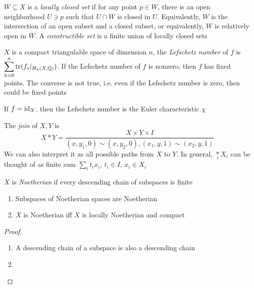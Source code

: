 \documentclass[main]{subfiles}
\begin{document}
\begin{definition}
$W\subseteq X$ is a \textit{locally closed set} if for any point $p\in W$, there is an open neighborhood $U\ni p$ such that $U\cap W$ is closed in $U$. Equivalently, $W$ is the intersection of an open subset and a closed subset, or equivalently, $W$ is relatively open in $\overline W$. A \textit{constructible set} is a finite union of locally closed sets
\end{definition}

\begin{theorem}\label{Lefschetz fixed point theorem}
$X$ is a compact triangulable space of dimension $n$, the \textit{Lefschetz number} of $f$ is $\displaystyle\sum_{k=0}^n\operatorname{tr}(f_*|_{H_k(X;\mathbb Q)})$. If the Lefschetz number of $f$ is nonzero, then $f$ has fixed points. The converse is not true, i.e. even if the Lefschetz number is zero, then could be fixed points \par
If $f=\operatorname{id}_X$, then the Lefschetz number is the Euler characteristic $\chi$
\end{theorem}

\begin{definition}
The \textit{join} of $X,Y$ is
\[X*Y=\frac{X\times Y\times I}{(x,y_1,0)\sim(x,y_2,0),(x_1,y,1)\sim(x_2,y,1)}\]
We can also interpret it as all possible paths from $X$ to $Y$. In general, $\underset{i}{*}X_i$ can be thought of as finite sum $\displaystyle\sum_it_ix_i$, $t_i\in I$, $x_i\in X_i$
\end{definition}

\begin{definition}
$X$ is \textit{Noetherian} if every descending chain of subspaces is finite
\end{definition}

\begin{proposition}
\begin{enumerate}
\item Subspaces of Noetherian spaces are Noetherian
\item $X$ is Noetherian iff $X$ is locally Noetherian and compact
\end{enumerate}
\end{proposition}

\begin{proof}
\begin{enumerate}
\item A descending chain of a subspace is also a descending chain
\item 
\end{enumerate}
\end{proof}
\end{document}
